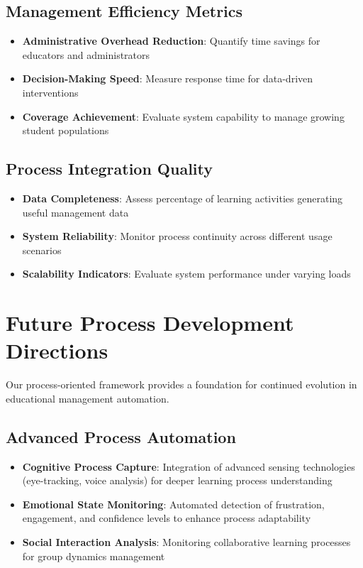 \documentclass[conference]{IEEEtran}
\begin{document}
\subsection{Management Efficiency Metrics}

\begin{itemize}
    \item \textbf{Administrative Overhead Reduction}: Quantify time savings for educators and administrators
    \item \textbf{Decision-Making Speed}: Measure response time for data-driven interventions
    \item \textbf{Coverage Achievement}: Evaluate system capability to manage growing student populations
\end{itemize}

\subsection{Process Integration Quality}

\begin{itemize}
    \item \textbf{Data Completeness}: Assess percentage of learning activities generating useful management data
    \item \textbf{System Reliability}: Monitor process continuity across different usage scenarios
    \item \textbf{Scalability Indicators}: Evaluate system performance under varying loads
\end{itemize}

\section{Future Process Development Directions}

Our process-oriented framework provides a foundation for continued evolution in educational management automation.

\subsection{Advanced Process Automation}

\begin{itemize}
    \item \textbf{Cognitive Process Capture}: Integration of advanced sensing technologies (eye-tracking, voice analysis) for deeper learning process understanding
    \item \textbf{Emotional State Monitoring}: Automated detection of frustration, engagement, and confidence levels to enhance process adaptability
    \item \textbf{Social Interaction Analysis}: Monitoring collaborative learning processes for group dynamics management
\end{itemize}
\end{document}
